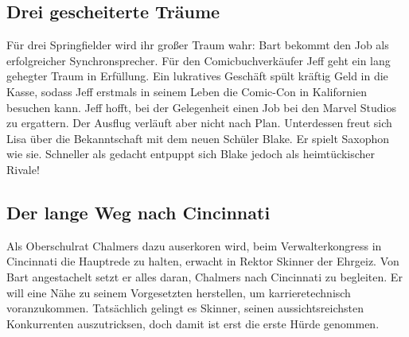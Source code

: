 
\subsection{Drei gescheiterte Träume}
Für drei Springfielder wird ihr großer Traum wahr: Bart bekommt den Job als erfolgreicher Synchronsprecher. Für den Comicbuchverkäufer Jeff geht ein lang gehegter Traum in Erfüllung. Ein lukratives Geschäft spült kräftig Geld in die Kasse, sodass Jeff erstmals in seinem Leben die Comic-Con in Kalifornien besuchen kann. Jeff hofft, bei der Gelegenheit einen Job bei den Marvel Studios zu ergattern. Der Ausflug verläuft aber nicht nach Plan. Unterdessen freut sich Lisa über die Bekanntschaft mit dem neuen Schüler Blake. Er spielt Saxophon wie sie. Schneller als gedacht entpuppt sich Blake jedoch als heimtückischer Rivale!


\subsection{Der lange Weg nach Cincinnati}
Als Oberschulrat Chalmers dazu auserkoren wird, beim Verwalterkongress in Cincinnati die Hauptrede zu halten, erwacht in Rektor Skinner der Ehrgeiz. Von Bart angestachelt setzt er alles daran, Chalmers nach Cincinnati zu begleiten. Er will eine Nähe zu seinem Vorgesetzten herstellen, um karrieretechnisch voranzukommen. Tatsächlich gelingt es Skinner, seinen aussichtsreichsten Konkurrenten auszutricksen, doch damit ist erst die erste Hürde genommen.


